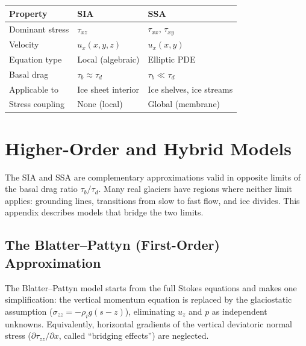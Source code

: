 \documentclass[11pt]{article}
\begin{document}
\begin{center}
\begin{tabular}{lll}
  \toprule
  Property & SIA & SSA \\
  \midrule
  Dominant stress & $\tau_{xz}$ & $\tau_{xx}$, $\tau_{xy}$ \\
  Velocity & $u_x(x,y,z)$ & $u_x(x,y)$ \\
  Equation type & Local (algebraic) & Elliptic PDE \\
  Basal drag & $\tau_b \approx \tau_d$ & $\tau_b \ll \tau_d$ \\
  Applicable to & Ice sheet interior & Ice shelves, ice streams \\
  Stress coupling & None (local) & Global (membrane) \\
  \bottomrule
\end{tabular}
\end{center}

\section{Higher-Order and Hybrid Models}
\label{app:hybrid}

The SIA and SSA are complementary approximations valid in opposite limits of the basal drag ratio $\tau_b/\tau_d$.  Many real glaciers have regions where neither limit applies: grounding lines, transitions from slow to fast flow, and ice divides.  This appendix describes models that bridge the two limits.

\subsection{The Blatter--Pattyn (First-Order) Approximation}

The Blatter--Pattyn model \cite{Blatter1995,Pattyn2003} starts from the full Stokes equations and makes one simplification: the vertical momentum equation is replaced by the glaciostatic assumption ($\sigma_{zz} = -\rho_i g(s-z)$), eliminating $u_z$ and $p$ as independent unknowns.  Equivalently, horizontal gradients of the vertical deviatoric normal stress ($\partial \tau_{zz}/\partial x$, called ``bridging effects'') are neglected.
\end{document}
